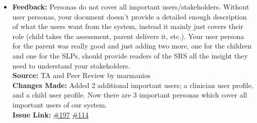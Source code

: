 \documentclass{article}
\begin{document}
\begin{itemize}
  \item 
    \textbf{Feedback:} Personas do not cover all important users/stakeholders. Without user personas, your document doesn't provide a detailed enough description of what the users want from the system, instead it mainly just covers their role (child takes the assessment, parent delivers it, etc.). Your user persona for the parent was really good and just adding two more, one for the children and one for the SLPs, should provide readers of the SRS all the insight they need to understand your stakeholders. \\
    \textbf{Source:} TA and Peer Review by marmanios\\
    \textbf{Changes Made:} Added 2 additional important users; a clinician user profile, and a child user profile. Now there are 3 important personas which cover all important users of our system.\\
    \textbf{Issue Link:} \href{https://github.com/parishanizam/TeleHealth/issues/197}{\#197} \href{https://github.com/parishanizam/TeleHealth/issues/114}{\#114}

  \end{itemize}

\newpage
\end{document}
